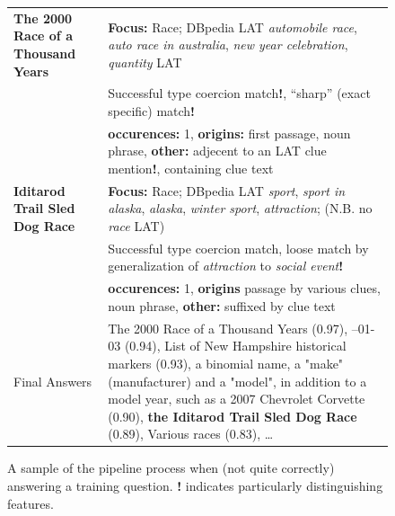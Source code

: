 \documentclass{poster15}
\begin{document}
\begin{figure}[t!]
\begin{tabular}{|p{1.8cm}p{6cm}|}
\textbf{The 2000 Race of a Thousand Years} %
	& \textbf{Focus:} Race; DBpedia LAT \textit{automobile race}, \textit{auto race in australia}, \textit{new year celebration}, \textit{quantity} LAT \\
	& Successful type coercion match\textbf{!}, ``sharp'' (exact specific) match\textbf{!} \\
	& \textbf{occurences:} 1, \textbf{origins:}  first passage, noun phrase, \textbf{other:} adjecent to an LAT clue mention\textbf{!}, containing clue text \\
\textbf{Iditarod Trail Sled Dog Race} %
	& \textbf{Focus:} Race; DBpedia LAT \textit{sport}, \textit{sport in alaska}, \textit{alaska}, \textit{winter sport}, \textit{attraction}; (N.B. no \textit{race} LAT) \\
	& Successful type coercion match, loose match by generalization of \textit{attraction} to \textit{social event}\textbf{!} \\
	& \textbf{occurences:} 1, \textbf{origins}   passage by various clues, noun phrase,
	\textbf{other:} suffixed by clue text \\ \hline

Final Answers & The 2000 Race of a Thousand Years (0.97), --01-03 (0.94), List of New Hampshire historical markers (0.93), a binomial name, a "make" (manufacturer) and a "model", in addition to a model year, such as a 2007 Chevrolet Corvette (0.90), \textbf{the Iditarod Trail Sled Dog Race} (0.89), Various races (0.83), \dots \\ \hline
\end{tabular}
\vspace*{-0.2cm}
\caption{A sample of the pipeline process when (not quite correctly) answering a training question. \textbf{!} indicates particularly distinguishing features.}
\label{fig:exIditarod}
\end{figure}
\end{document}

